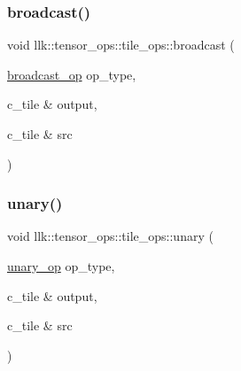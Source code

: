 \mbox{\label{namespacellk_1_1tensor__ops_1_1tile__ops_a63bea211ae34a5de923fa501c849f16c}} 
\subsubsection{\texorpdfstring{broadcast()}{broadcast()}}
{\footnotesize\ttfamily void llk\+::tensor\+\_\+ops\+::tile\+\_\+ops\+::broadcast (\begin{DoxyParamCaption}\item[{\hyperlink{namespacellk_1_1tensor__ops_ac43a7c3eb367c669baaa45a327aeca58}{broadcast\+\_\+op}}]{op\+\_\+type,  }\item[{c\+\_\+tile \&}]{output,  }\item[{c\+\_\+tile \&}]{src }\end{DoxyParamCaption})}

\mbox{\label{namespacellk_1_1tensor__ops_1_1tile__ops_a3d2947958d24366977b0b37efe452d59}} 
\subsubsection{\texorpdfstring{unary()}{unary()}}
{\footnotesize\ttfamily void llk\+::tensor\+\_\+ops\+::tile\+\_\+ops\+::unary (\begin{DoxyParamCaption}\item[{\hyperlink{namespacellk_1_1tensor__ops_a5fae70cbcf6cd7aadca4a04278614633}{unary\+\_\+op}}]{op\+\_\+type,  }\item[{c\+\_\+tile \&}]{output,  }\item[{c\+\_\+tile \&}]{src }\end{DoxyParamCaption})}

